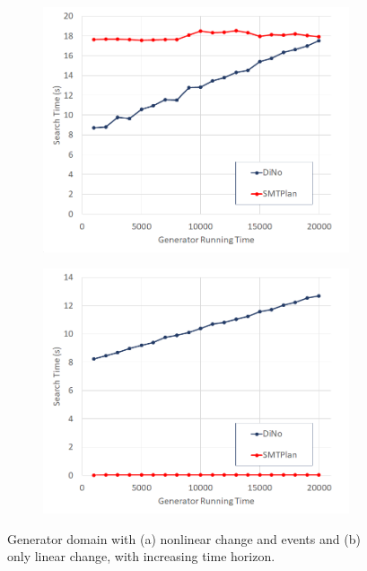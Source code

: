 \begin{figure}[tbp!]
\centering
\begin{subfigure}[b]{0.49\textwidth}
\includegraphics[width=0.99\textwidth]{diagrams/gen_event.png}
\caption{}
\label{fig:Picture4}
\end{subfigure}
\hfill
\begin{subfigure}[b]{0.48\textwidth}
\includegraphics[width=0.99\textwidth]{diagrams/gen_linear.png}
\caption{}
\label{fig:Picture3}
\end{subfigure}
\caption{Generator domain with (a) nonlinear change and events and (b) only linear change, with increasing time horizon.}
\end{figure}

